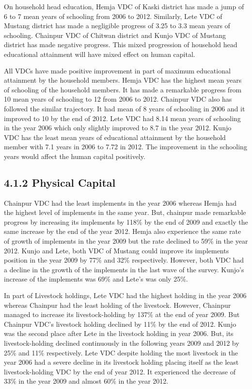 \documentclass[12pt, a4paper]{article}
\begin{document}
On household head education, Hemja VDC of Kaski district has made a jump of 6 to 7 mean years of schooling from 2006 to 2012. Similarly, Lete VDC of Mustang district has made a negligible progress of 3.25 to 3.3 mean years of schooling. Chainpur VDC of Chitwan district and Kunjo VDC of Mustang district has made negative progress. This mixed progression of household head educational attainment will have mixed effect on human capital. 

All VDCs have made positive improvement in part of maximum educational attainment by the household members. Hemja VDC has the highest mean years of schooling of the household members. It has made a remarkable progress from 10 mean years of schooling to 12 from 2006 to 2012. Chainpur VDC also has followed the similar trajectory. It had mean of 8 years of schooling in 2006 and it improved to 10 by the end of 2012. Lete VDC had 8.14 mean years of schooling in the year 2006 which only slightly improved to 8.7 in the year 2012. Kunjo VDC has the least mean years of educational attainment by the household member with 7.1 years in 2006 to 7.72 in 2012. The improvement in the schooling years would affect the human capital positively.

\subsection*{4.1.2 Physical Capital}
Chainpur VDC had the least implements in the year 2006 whereas Hemja had the highest level of implements in the same year. But, chainpur made remarkable progress by increasing its implements by 118\%  by the end of 2009 and exactly the same increase by the end of the year 2012. Hemja also experience the same rate of growth of implements in the year 2009 but the rate declined to 59\% in the year 2012. Kunjo and Lete, both VDC of Mustang could improve its implements position in the year 2009 by 77\% and 32\% respectively. However, both VDC had a decline in the growth of the implements in the last wave of the survey. Kunjo's increase of the implements was 69\% and Lete's was only 25\%. 

In part of Livestock holdings, Lete VDC had the highest holding in the year 2006 whereas Chainpur had the least holding of the livestock. However, Chainpur managed to increase its livestock-holding by 137\% at the end of year 2009. But Chainpur VDC's livestock holding declined by 11\% by the end of 2012. Kunjo was the second place after Lete in the livestock holding in year 2006. But, its livestock-holding declined continuously in the following years 2009 and 2012 by 25\% and 11\% respectively. Lete VDC despite holding the most livestock in the year 2006 had a severe decline in its livestock holding placing itself as the least livestock-holding VDC by the end of year 2012. It experienced the decrease of 33\% in the year 2009 and almost 60\% in the year 2012. 
\end{document}
